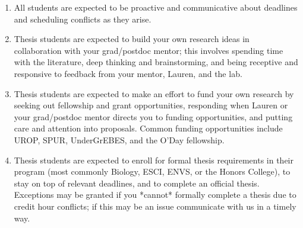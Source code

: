 \documentclass[12pt]{article}
\begin{document}
\begin{enumerate}
\item All students are expected to be proactive and communicative about deadlines and scheduling conflicts as they arise.

\item Thesis students are expected to build your own research ideas in collaboration with your grad/postdoc mentor; this involves spending time with the literature, deep thinking and brainstorming, and being receptive and responsive to feedback from your mentor, Lauren, and the lab.

\item Thesis students are expected to make an effort to fund your own research by seeking out fellowship and grant opportunities, responding when Lauren or your grad/postdoc mentor directs you to funding opportunities, and putting care and attention into proposals. Common funding opportunities include UROP, SPUR, UnderGrEBES, and the O'Day fellowship. 

\item Thesis students are expected to enroll for formal thesis requirements in their program (most commonly Biology, ESCI, ENVS, or the Honors College), to stay on top of relevant deadlines, and to complete an official thesis. Exceptions may be granted if you *cannot* formally complete a thesis due to credit hour conflicts; if this may be an issue communicate with us in a timely way.

\end{enumerate}
\end{document}

